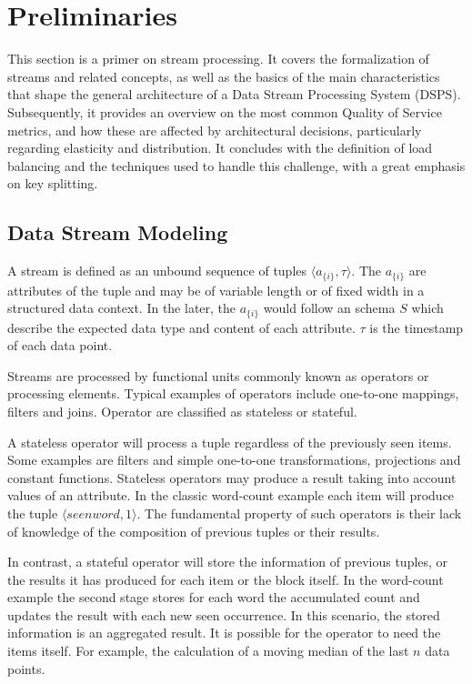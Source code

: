 \chapter{Preliminaries
  \label{chapter:preliminaries}}

  This section is a primer on stream processing. It covers the formalization of
  streams and related concepts, as well as the basics of the main
  characteristics that shape the general architecture of a Data Stream
  Processing System (DSPS). Subsequently, it provides an overview on the most
  common Quality of Service metrics, and how these are affected by
  architectural decisions, particularly regarding elasticity and distribution.
  It concludes with the definition of load balancing and the techniques used to
  handle this challenge, with a great emphasis on key splitting.

  \section{Data Stream Modeling}

  A stream is defined as an unbound sequence of tuples $\langle
  a_{\{i\}},\tau\rangle$. The $a_{\{i\}}$ are attributes of the tuple and may
  be of variable length or of fixed width in a structured data context. In the
  later, the $a_{\{i\}}$ would follow an schema $S$ which describe the expected
  data type and  content of each attribute. $\tau$ is the timestamp of each
  data point.

  Streams are processed by functional units commonly known as operators or
  processing elements. Typical examples of operators include one-to-one
  mappings, filters and joins. Operator are classified as stateless or stateful.

  A stateless operator will process a tuple regardless of the previously seen
  items. Some examples are filters and simple one-to-one transformations,
  projections and constant functions. Stateless operators may produce a result
  taking into account values of an attribute. In the classic word-count
  example each item will produce the tuple $\langle seenword, 1\rangle$. The
  fundamental property of such operators is their lack of knowledge of the
  composition of previous tuples or their results.

  In contrast, a stateful operator will store the information of previous
  tuples, or the results it has produced for each item or the block itself. In
  the word-count example the second stage stores for each word the accumulated
  count and updates the result with each new seen occurrence. In this scenario,
  the stored information is an aggregated result. It is possible for
  the operator to need the items itself. For example, the calculation of a moving median of the last $n$ data points.

